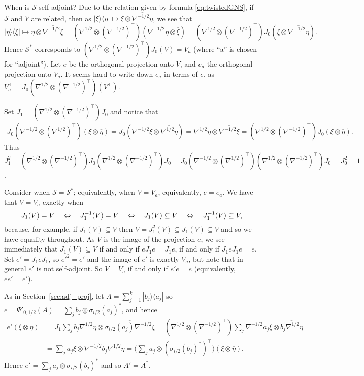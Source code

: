 \documentclass[a4paper,11pt]{article}
\theoremstyle{plain}
\theoremstyle{remark}
\newcommand{\mc}[1]{\mathcal{#1}}
\begin{document}
When is $\mc S$ self-adjoint?  Due to the relation given by formula \eqref{eq:twistedGNS}, if $\mc S$ and $V$ are related, then as $|\xi\rangle\langle\eta| \mapsto \xi\otimes\overline{\nabla^{-1/2}\eta}$, we see that
\[ |\eta\rangle\langle\xi| \mapsto \eta\otimes\overline{\nabla^{-1/2}\xi}
= (\nabla^{1/2} \otimes (\nabla^{-1/2})^\top)(\nabla^{-1/2}\eta \otimes \overline\xi)
= (\nabla^{1/2} \otimes (\nabla^{-1/2})^\top) J_0 (\xi\otimes\overline{\nabla^{-1/2}\eta}). \]
Hence $\mc S^*$ corresponds to $(\nabla^{1/2} \otimes (\nabla^{-1/2})^\top) J_0(V) = V_a$ (where ``a'' is chosen for ``adjoint'').  Let $e$ be the orthogonal projection onto $V$, and $e_a$ the orthogonal projection onto $V_a$.  It seems hard to write down $e_a$ in terms of $e$, as $V_a^\perp = J_0 (\nabla^{1/2} \otimes (\nabla^{-1/2})^\top) (V^\perp)$.

Set $J_1 = (\nabla^{1/2} \otimes (\nabla^{-1/2})^\top) J_0$ and notice that
\begin{align*}
  J_0 (\nabla^{-1/2} \otimes (\nabla^{1/2})^\top) (\xi\otimes\overline\eta)
= J_0 (\nabla^{-1/2}\xi \otimes \overline{\nabla^{1/2}\eta})
= \nabla^{1/2}\eta \otimes \overline{\nabla^{-1/2}\xi}
= (\nabla^{1/2} \otimes (\nabla^{-1/2})^\top) J_0 (\xi\otimes\overline\eta).
\end{align*}
Thus $J_1^2 = (\nabla^{1/2} \otimes (\nabla^{-1/2})^\top) J_0 (\nabla^{1/2} \otimes (\nabla^{-1/2})^\top) J_0 = J_0 (\nabla^{-1/2} \otimes (\nabla^{1/2})^\top) (\nabla^{1/2} \otimes (\nabla^{-1/2})^\top) J_0 = J_0^2 = 1$.

Consider when $\mc S = \mc S^*$; equivalently, when $V = V_a$, equivalently, $e = e_a$.
We have that $V = V_a$ exactly when
\begin{equation} \notag
  J_1(V) = V
  \quad\Leftrightarrow\quad
  J_1^{-1}(V) = V
  \quad\Leftrightarrow\quad
  J_1(V) \subseteq V
  \quad\Leftrightarrow\quad
  J_1^{-1}(V) \subseteq V,
\end{equation}
because, for example, if $J_1(V) \subseteq V$ then $V = J_1^2(V) \subseteq J_1(V) \subseteq V$ and so we have equality throughout.  As $V$ is the image of the projection $e$, we see immediately that $J_1(V) \subseteq V$ if and only if $e J_1 e = J_1 e$, if and only if $J_1 e J_1 e = e$.  Set $e' = J_1 e J_1$, so $e'^2 = e'$ and the image of $e'$ is exactly $V_a$, but note that in general $e'$ is not self-adjoint.  So $V=V_a$ if and only if $e'e = e$ (equivalently, $ee' = e'$).

As in Section~\ref{sec:adj_proj}, let $A = \sum_{j=1}^k | b_j \rangle \langle a_j |$ so $e = \Psi'_{0,1/2}(A) = \sum_j b_j \otimes \sigma_{i/2}(a_j)^*$, and hence
\begin{align*}
e' (\xi\otimes\overline\eta)
&= J_1 \sum_j b_j\nabla^{1/2}\eta \otimes \overline{\sigma_{i/2}(a_j) \nabla^{-1/2}\xi}
= (\nabla^{1/2} \otimes (\nabla^{-1/2})^\top) \sum_j \nabla^{-1/2} a_j \xi \otimes \overline{b_j\nabla^{1/2}\eta} \\
&= \sum_j a_j \xi \otimes \overline{\nabla^{-1/2}b_j\nabla^{1/2}\eta}
= \Big( \sum_j a_j \otimes (\sigma_{i/2}(b_j)^*)^\top \Big) (\xi\otimes\overline\eta).
\end{align*}
Hence $e' = \sum_j a_j \otimes \sigma_{i/2}(b_j)^*$ and so $A' = A^*$.
\end{document}
